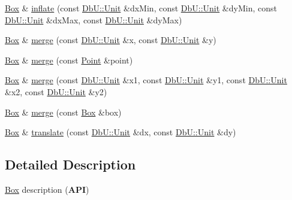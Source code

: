 \begin{DoxyCompactItemize}
\item 
\hyperlink{classHurricane_1_1Box}{Box} \& \hyperlink{classHurricane_1_1Box_afd1baf9f272878a87c2525f0fa2eab71}{inflate} (const \hyperlink{group__DbUGroup_ga4fbfa3e8c89347af76c9628ea06c4146}{Db\-U\-::\-Unit} \&dx\-Min, const \hyperlink{group__DbUGroup_ga4fbfa3e8c89347af76c9628ea06c4146}{Db\-U\-::\-Unit} \&dy\-Min, const \hyperlink{group__DbUGroup_ga4fbfa3e8c89347af76c9628ea06c4146}{Db\-U\-::\-Unit} \&dx\-Max, const \hyperlink{group__DbUGroup_ga4fbfa3e8c89347af76c9628ea06c4146}{Db\-U\-::\-Unit} \&dy\-Max)
\item 
\hyperlink{classHurricane_1_1Box}{Box} \& \hyperlink{classHurricane_1_1Box_ab77fe56f9350f06cc872bbb4f83835da}{merge} (const \hyperlink{group__DbUGroup_ga4fbfa3e8c89347af76c9628ea06c4146}{Db\-U\-::\-Unit} \&x, const \hyperlink{group__DbUGroup_ga4fbfa3e8c89347af76c9628ea06c4146}{Db\-U\-::\-Unit} \&y)
\item 
\hyperlink{classHurricane_1_1Box}{Box} \& \hyperlink{classHurricane_1_1Box_af1f7dfe8984c2d26fbca78b21358ee2b}{merge} (const \hyperlink{classHurricane_1_1Point}{Point} \&point)
\item 
\hyperlink{classHurricane_1_1Box}{Box} \& \hyperlink{classHurricane_1_1Box_ad97e73e91dd36404eb0dde9d44ff2fd7}{merge} (const \hyperlink{group__DbUGroup_ga4fbfa3e8c89347af76c9628ea06c4146}{Db\-U\-::\-Unit} \&x1, const \hyperlink{group__DbUGroup_ga4fbfa3e8c89347af76c9628ea06c4146}{Db\-U\-::\-Unit} \&y1, const \hyperlink{group__DbUGroup_ga4fbfa3e8c89347af76c9628ea06c4146}{Db\-U\-::\-Unit} \&x2, const \hyperlink{group__DbUGroup_ga4fbfa3e8c89347af76c9628ea06c4146}{Db\-U\-::\-Unit} \&y2)
\item 
\hyperlink{classHurricane_1_1Box}{Box} \& \hyperlink{classHurricane_1_1Box_a0bdfa52a3f5f6639680ba7dbc52c21d7}{merge} (const \hyperlink{classHurricane_1_1Box}{Box} \&box)
\item 
\hyperlink{classHurricane_1_1Box}{Box} \& \hyperlink{classHurricane_1_1Box_aa689be4b37c83412f3dc95fc23c82156}{translate} (const \hyperlink{group__DbUGroup_ga4fbfa3e8c89347af76c9628ea06c4146}{Db\-U\-::\-Unit} \&dx, const \hyperlink{group__DbUGroup_ga4fbfa3e8c89347af76c9628ea06c4146}{Db\-U\-::\-Unit} \&dy)
\end{DoxyCompactItemize}


\subsection{Detailed Description}
\hyperlink{classHurricane_1_1Box}{Box} description ({\bfseries A\-P\-I}) 

